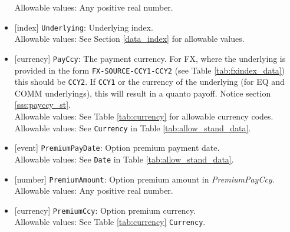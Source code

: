 \begin{itemize}
    Allowable values: Any positive real number.
    \item{}[index] \lstinline!Underlying!: Underlying index. \\
    Allowable values: See Section \ref{data_index} for allowable values.
    \item{}[currency] \lstinline!PayCcy!: The payment currency. For FX, where the underlying is provided
      in the form \lstinline!FX-SOURCE-CCY1-CCY2! (see Table \ref{tab:fxindex_data}) this should
      be \lstinline!CCY2!. If \lstinline!CCY1! or the currency of the underlying (for EQ and
      COMM underlyings), this will result in a quanto payoff. Notice section \ref{sss:payccy_st}. \\
        Allowable values: See Table \ref{tab:currency} for allowable currency codes.
    Allowable values: See \lstinline!Currency! in Table \ref{tab:allow_stand_data}.
    \item{}[event] \lstinline!PremiumPayDate!: Option premium payment date. \\
    Allowable values: See \lstinline!Date! in Table \ref{tab:allow_stand_data}.
    \item{}[number] \lstinline!PremiumAmount!: Option premium amount in \emph{PremiumPayCcy}. \\
    Allowable values: Any positive real number.
    \item{}[currency] \lstinline!PremiumCcy!: Option premium currency. \\
    Allowable values: See Table \ref{tab:currency} \lstinline!Currency!.
\end{itemize}
